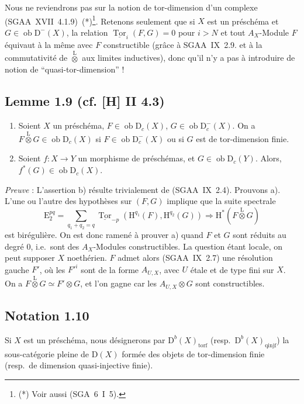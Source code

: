 \documentclass[11pt]{article}
\renewcommand{\H}{\mathrm{H}}
\DeclareMathOperator{\Tor}{Tor}
\newcommand{\D}{\mathrm{D}}
\newcommand{\E}{\mathrm{E}}
\newcommand{\ob}{\operatorname{ob}}
\providecommand{\ob}{\operatorname{ob}}
\begin{document}
Nous ne reviendrons pas sur la notion de tor-dimension d'un complexe (SGAA~XVII~4.1.9)~(*)\footnote{(*) Voir aussi (SGA~6~I~5).}. Retenons seulement que si $X$ est un préschéma et $G \in \ob \D^{-}(X)$, la relation $\underline{\Tor}_i(F,G) = 0$ pour $i > N$ et tout $A_X$-Module $F$ équivaut à la même avec $F$ constructible (grâce à SGAA~IX~2.9. et à la commutativité de $\mathop{\otimes}\limits^{\mathrm{L}}$ aux limites inductives), donc qu'il n'y a pas à introduire de notion de ``quasi-tor-dimension'' !

\subsection*{Lemme 1.9 (cf. [H] II 4.3)}
\begin{enumerate}
\item[a)] Soient $X$ un préschéma, $F \in \ob \D_c(X)$, $G \in \ob \D_c^{-}(X)$. On a $F \mathop{\otimes}\limits^{\mathrm{L}} G \in \ob \D_c(X)$ si $F \in \ob \D_c^{-}(X)$ ou si $G$ est de tor-dimension finie.
\item[b)] Soient $f : X \to Y$ un morphisme de préschémas, et $G \in \ob \D_c(Y)$. Alors, $f^{*}(G) \in \ob \D_c(X)$.
\end{enumerate}

\emph{Preuve} : L'assertion b) résulte trivialement de (SGAA~IX~2.4). Prouvons a). L'une ou l'autre des hypothèses sur $(F,G)$ implique que la suite spectrale
\[
\E_2^{pq} = \sum_{q_1+q_2=q} \underline{\Tor}_{-p}(\H^{q_1}(F), \H^{q_2}(G)) \Rightarrow \H^{*}(F \mathop{\otimes}\limits^{\mathrm{L}} G)
\]
est birégulière. On est donc ramené à prouver a) quand $F$ et $G$ sont réduits au degré $0$, i.e.~sont des $A_X$-Modules constructibles. La question étant locale, on peut supposer $X$ noethérien. $F$ admet alors (SGAA~IX~2.7) une résolution gauche $F'$, où les $F'^i$ sont de la forme $A_{U,X}$, avec $U$ étale et de type fini sur $X$. On a $F \mathop{\otimes}\limits^{\mathrm{L}} G \simeq F' \otimes G$, et l'on gagne car les $A_{U,X} \otimes G$ sont constructibles.

\subsection*{Notation 1.10}
Si $X$ est un préschéma, nous désignerons par $\D^{b}(X)_{\mathrm{torf}}$ (resp.~$\D^{b}(X)_{\mathrm{qinjf}}$) la sous-catégorie pleine de $\D(X)$ formée des objets de tor-dimension finie (resp.~de dimension quasi-injective finie).
\end{document}
